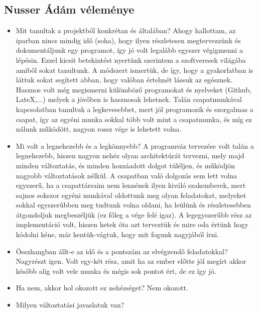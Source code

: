 \subsection{Nusser Ádám véleménye}
\begin{itemize}
\item Mit tanultak a projektből konkrétan és általában?\newline
	Ahogy hallottam, az iparban nincs mindig idő (soha), hogy ilyen részletesen megtervezzünk és dokumentáljunk egy programot, így jó volt legalább egyszer végigmenni a lépésin. Ezzel kicsit betekintést nyertünk szerintem a szoftveresek világába amiből sokat tanultunk. A módszert ismertük, de így, hogy a gyakorlatban is láttuk sokat segített abban, hogy valóban értelmét lássuk az egésznek. Hasznos volt még megismerni külömböző programokat és nyelveket (Github, LateX,...) melyek a jövőben is hasznosak lehetnek.
\newline Talán csapatmunkával kapcsolatban tanultuk a legkevesebbet, mert jól programozik és szorgalmas a csapat, így az egyéni munka sokkal több volt mint a csapatmunka, és míg ez nálunk működött, nagyon rossz vége is lehetett volna.
\item Mi volt a legnehezebb és a legkönnyebb? \newline
	A programváz tervezése volt talán a legnehezebb, hiszen nagyon nehéz olyan architektúrát tervezni, mely majd minden változtatás, és minden hozzáadott dolgot túléljen, és működjön nagyobb változtatások nélkül. A csapatban való dolgozás sem lett volna egyszerű, ha a csapattársaim nem lennének ilyen kiváló szakemberek, mert sajnos sokszor egyéni munkával oldottunk meg olyan feladatokat, melyeket sokkal egyszerűbben meg tudtunk volna oldani, ha leülünk és részletesebben átgondoljuk megbeszéljük (ez főleg a vége felé igaz). 
\newline A legegyszerűbb rész az implementáció volt, hiszen hetek óta azt terveztük és mire oda értünk hogy kódolni kéne, már kentük-vágtuk, hogy mit fogunk nagyjából írni. 
\item Összhangban állt-e az idő és a pontszám az elvégzendő feladatokkal? \newline
	Nagyrészt igen. Volt egy-két rész, amit ha az ember előtte jól megírt akkor később alig volt vele munka és mégis sok pontot ért, de ez így jó.
\item Ha nem, akkor hol okozott ez nehézséget? \newline
	Nem okozott.
\item Milyen változtatási javaslatuk van? \newline

\end{itemize}
